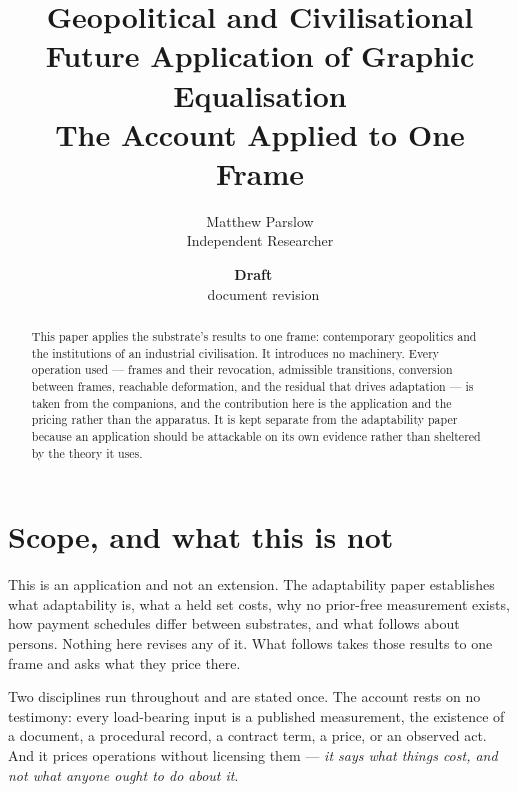 \documentclass[11pt,a4paper]{article}
\title{Geopolitical and Civilisational Future Application of Graphic Equalisation\\\large The Account Applied to One Frame}
\author{Matthew Parslow\\Independent Researcher}
\date{\textbf{Draft \texorpdfstring{\textemdash}{---}\ \PaperDraft}\\[2pt]\PaperDisplayDate \texorpdfstring{\textbullet}{\textperiodcentered}\ document revision \PaperRevision}
\theoremstyle{remark}
\begin{document}
\maketitle
\begin{center}
\end{center}
\vspace{1em}

\begin{abstract}
This paper applies the substrate's results to one frame: contemporary geopolitics and the institutions of
an industrial civilisation. It introduces no machinery. Every operation used --- frames and their
revocation, admissible transitions, conversion between frames, reachable deformation, and the residual
that drives adaptation --- is taken from the companions, and the contribution here is the application and
the pricing rather than the apparatus. It is kept separate from the adaptability paper
because an application should be attackable on its own evidence rather than sheltered by the theory it
uses.
\end{abstract}

\section{Scope, and what this is not}\label{sec:scope}
This is an application and not an extension. The adaptability paper establishes what
adaptability is, what a held set costs, why no prior-free measurement exists, how payment schedules
differ between substrates, and what follows about persons. Nothing here revises any of it. What
follows takes those results to one frame and asks what they price there.

Two disciplines run throughout and are stated once. The account rests on no testimony: every
load-bearing input is a published measurement, the existence of a document, a procedural record, a
contract term, a price, or an observed act. And it prices operations without licensing them ---
\emph{it says what things cost, and not what anyone ought to do about it}.
\end{document}
